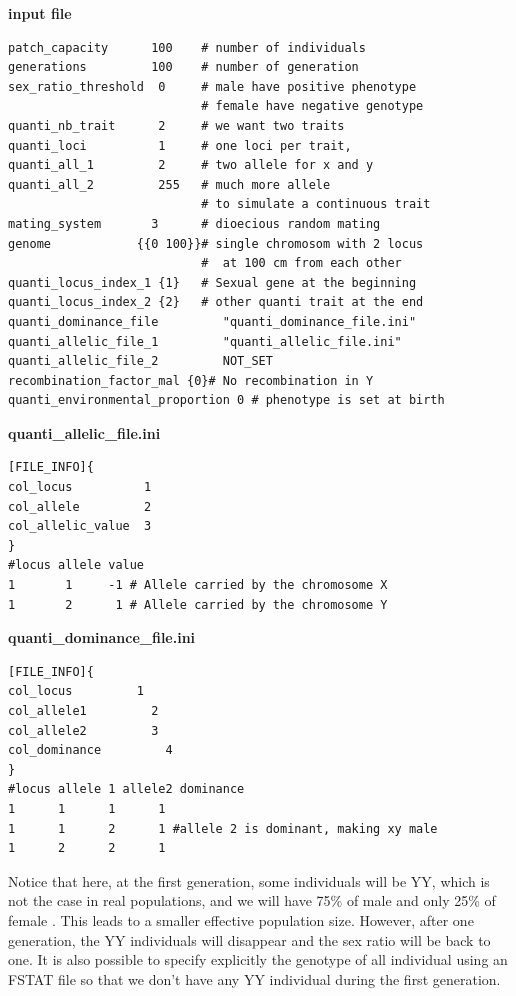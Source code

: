 \documentclass[letterpaper,12pt,oneside]{book}
\begin{document}
\begin{appendices}
\textbf{input file}
\begin{lstlisting}[frame=single]
patch_capacity      100    # number of individuals         
generations         100    # number of generation     
sex_ratio_threshold  0     # male have positive phenotype    
                           # female have negative genotype    
quanti_nb_trait      2     # we want two traits
quanti_loci          1     # one loci per trait,
quanti_all_1         2     # two allele for x and y
quanti_all_2         255   # much more allele 
                           # to simulate a continuous trait
mating_system       3      # dioecious random mating    
genome            {{0 100}}# single chromosom with 2 locus 
                           #  at 100 cm from each other          
quanti_locus_index_1 {1}   # Sexual gene at the beginning 
quanti_locus_index_2 {2}   # other quanti trait at the end     
quanti_dominance_file         "quanti_dominance_file.ini"         
quanti_allelic_file_1         "quanti_allelic_file.ini"    
quanti_allelic_file_2         NOT_SET
recombination_factor_mal {0}# No recombination in Y
quanti_environmental_proportion 0 # phenotype is set at birth 
\end{lstlisting}
\textbf{quanti\_allelic\_file.ini}
\begin{lstlisting}[frame=single]
[FILE_INFO]{
col_locus          1         
col_allele         2         
col_allelic_value  3         
} 
#locus allele value
1       1     -1 # Allele carried by the chromosome X
1       2      1 # Allele carried by the chromosome Y
\end{lstlisting}
\textbf{quanti\_dominance\_file.ini}
\begin{lstlisting}[frame=single]
[FILE_INFO]{
col_locus         1         
col_allele1         2         
col_allele2         3         
col_dominance         4         
} 
#locus allele 1 allele2 dominance
1      1      1      1
1      1      2      1 #allele 2 is dominant, making xy male 
1      2      2      1     
\end{lstlisting}


    
    
Notice that here, at the first generation, some individuals will be YY, which is not the case in real populations, and we will have 75\% of male and only 25\% of female . This leads to a smaller effective population size.  However, after one generation, the YY individuals will disappear and the sex ratio will be back to one. It is also possible to specify explicitly the genotype of all individual using an FSTAT file so that we don't have any YY individual during the first generation. 

\end{appendices}
\end{document}
